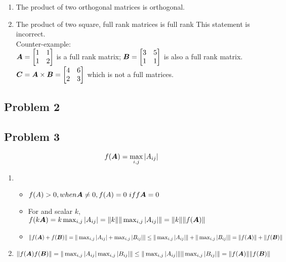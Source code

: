 \documentclass{article}
\begin{document}
\begin{enumerate}
\item The product of two orthogonal matrices is orthogonal.

\item The product of two square, full rank matrices is full rank
This statement is incorrect. \\
Counter-example:\\
$\boldsymbol{A}=\begin{bmatrix} 1&1\\1&2 \end{bmatrix}$ is a full rank matrix; \newline
$\boldsymbol{B}=\begin{bmatrix} 3&5\\1&1 \end{bmatrix}$ is also a full rank matrix.\newline
$\boldsymbol{C} = \boldsymbol{A}\times\boldsymbol{B} = \begin{bmatrix} 4&6\\2&3 \end{bmatrix} $ which is not a full matrices.  \newline


\end{enumerate} 

\hypertarget{problem_2_prove_or_disprove_3}{}
\subsection*{{Problem 2}}
\label{problem_1_prove_or_disprove_3}




\hypertarget{problem_3_prove_or_disprove_3}{}
\subsection*{{Problem 3}}
\label{problem_1_prove_or_disprove_3}

\begin{align} 
f(\boldsymbol{A}) = \max_{i,j}|A_{ij}| 
\end{align} 

\begin{enumerate} 

\item 
\begin{itemize}
\item  $f(A)>0, when \mA\neq0, \\ f(A)=0\ iff \mA=0 $
\item For and scalar $k$, \\  $ f(k\boldsymbol{A}) \\=k \max_{i,j}|A_{ij}| \\= \|k\|\| \max_{i,j}|A_{ij}|\| \\=\|k\|\| f(\boldsymbol{A})\|$
\item
$\|f(\boldsymbol{A})+f(\boldsymbol{B})\| \\
=\|\max_{i,j}|A_{ij}| +\max_{i,j}|B_{ij}|\|\\ 
\leq \|\max_{i,j}|A_{ij}| \|+\| \max_{i,j}|B_{ij}|\| \\
=\|f(\boldsymbol{A})\| + \|f(\boldsymbol{B})\|$
\end{itemize}

\item 
$\|f(\boldsymbol{A})f(\boldsymbol{B})\| \\
=\|\max_{i,j}|A_{ij}| \max_{i,j}|B_{ij}|\|\\ 
\leq \|\max_{i,j}|A_{ij}| \|\| \max_{i,j}|B_{ij}|\| \\
=\|f(\boldsymbol{A})\|  \|f(\boldsymbol{B})\|$
\end{enumerate} 
\end{document}
